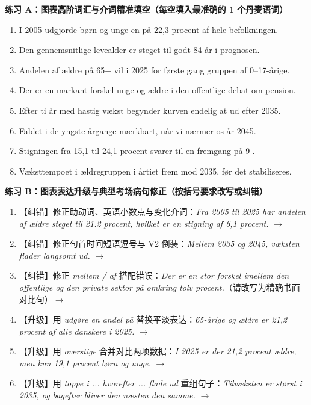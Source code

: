\textbf{练习 A：图表高阶词汇与介词精准填空（每空填入最准确的 1 个丹麦语词）}
\begin{enumerate}
  \item I 2005 udgjorde børn og unge en \underline{\hspace{2.2cm}} på 22,3 procent af hele befolkningen.
  \item Den gennemsnitlige levealder er steget \underline{\hspace{2.2cm}} til godt 84 år i prognosen.
  \item Andelen af ældre på 65+ vil i 2025 for første gang \underline{\hspace{2.2cm}} gruppen af 0--17-årige.
  \item Der er en markant forskel \underline{\hspace{2.2cm}} unge og ældre i den offentlige debat om pension.
  \item Efter ti år med hastig vækst begynder kurven endelig at \underline{\hspace{2.2cm}} ud efter 2035.
  \item Faldet i de yngste årgange \underline{\hspace{2.2cm}} mærkbart, når vi nærmer os år 2045.
  \item Stigningen fra 15,1 til 24,1 procent svarer til en fremgang på 9 \underline{\hspace{2.2cm}}.
  \item Væksttempoet i ældregruppen \underline{\hspace{2.2cm}} i årtiet frem mod 2035, før det stabiliseres.
\end{enumerate}

\textbf{练习 B：图表表达升级与典型考场病句修正（按括号要求改写或纠错）}
\begin{enumerate}
  \item 【纠错】修正助动词、英语小数点与变化介词：\textit{Fra 2005 til 2025 har andelen af ældre steget til 21.2 procent, hvilket er en stigning af 6,1 procent.} $\rightarrow$
  \item 【纠错】修正句首时间短语逗号与 V2 倒装：\textit{Mellem 2035 og 2045, væksten flader langsomt ud.} $\rightarrow$
  \item 【纠错】修正 \textit{mellem / af} 搭配错误：\textit{Der er en stor forskel imellem den offentlige og den private sektor på omkring tolv procent.}（请改写为精确书面对比句）$\rightarrow$
  \item 【升级】用 \textit{udgøre en andel på} 替换平淡表达：\textit{65-årige og ældre er 21,2 procent af alle danskere i 2025.} $\rightarrow$
  \item 【升级】用 \textit{overstige} 合并对比两项数据：\textit{I 2025 er der 21,2 procent ældre, men kun 19,1 procent børn og unge.} $\rightarrow$
  \item 【升级】用 \textit{toppe i ... hvorefter ... flade ud} 重组句子：\textit{Tilvæksten er størst i 2035, og bagefter bliver den næsten den samme.} $\rightarrow$
\end{enumerate}

